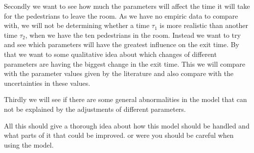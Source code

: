 Secondly we want to see how much the parameters will affect the time it will take for 
the pedestrians to leave the room. As we have no empiric data to compare with, we will 
not be determining whether a time $\tau_1$ is more realistic than another time $\tau_2$, 
when we have the ten pedestrians in the room. Instead we want to try and see which 
parameters will have the greatest influence on the exit time. By that we want to some 
qualitative idea about which changes of different parameters are having the biggest change 
in the exit time. This we will compare with the parameter values given by the literature 
and also compare with the uncertainties in these values.

Thirdly we will see if there are some general abnormalities in the model that can not be 
explained by the adjustments of different parameters.

All this should give a thorough idea about how this model should be handled and what parts 
of it that could be improved. or were you should be careful when using the model.
